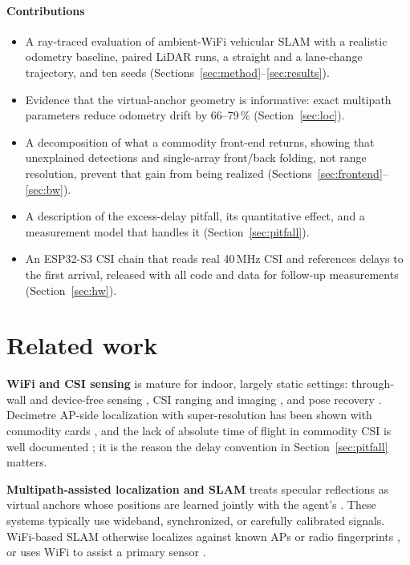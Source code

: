 \documentclass[preprint,12pt]{elsarticle}
\begin{document}
\paragraph{Contributions}
\begin{itemize}
  \item A ray-traced evaluation of ambient-WiFi vehicular SLAM with a realistic odometry
        baseline, paired LiDAR runs, a straight and a lane-change trajectory, and ten seeds
        (Sections~\ref{sec:method}--\ref{sec:results}).
  \item Evidence that the virtual-anchor geometry is informative: exact multipath parameters
        reduce odometry drift by 66--79\,\% (Section~\ref{sec:loc}).
  \item A decomposition of what a commodity front-end returns, showing that unexplained
        detections and single-array front/back folding, not range resolution, prevent that
        gain from being realized (Sections~\ref{sec:frontend}--\ref{sec:bw}).
  \item A description of the excess-delay pitfall, its quantitative effect, and a measurement
        model that handles it (Section~\ref{sec:pitfall}).
  \item An ESP32-S3 CSI chain that reads real 40\,MHz CSI and references delays to the first
        arrival, released with all code and data for follow-up measurements
        (Section~\ref{sec:hw}).
\end{itemize}

\section{Related work}\label{sec:related}

\textbf{WiFi and CSI sensing} is mature for indoor, largely static settings: through-wall and
device-free sensing \cite{chetty2012ttwifi,zhao2018rfpose,zhao2018rfpose3d}, CSI ranging and
imaging \cite{li2021standalone,wang2025csipower,maatta2024csipointcloud}, and pose recovery
\cite{geng2022denseposewifi,yan2024personinwifi3d}. Decimetre AP-side localization with
super-resolution has been shown with commodity cards \cite{kotaru2015spotfi}, and the lack of
absolute time of flight in commodity CSI is well documented \cite{xie2015pdp}; it is the reason
the delay convention in Section~\ref{sec:pitfall} matters.

\textbf{Multipath-assisted localization and SLAM} treats specular reflections as virtual
anchors whose positions are learned jointly with the agent's
\cite{leitinger2015jsac,gentner2016channelslam,ulmschneider2017multipath,leitinger2024mpslamcoop,li2024bpmpslam}.
These systems typically use wideband, synchronized, or carefully calibrated signals. WiFi-based
SLAM otherwise localizes against known APs or radio fingerprints
\cite{arun2022p2slam,liu2023radiofingerprintslam}, or uses WiFi to assist a primary sensor
\cite{arun2022viwid,ismail2022wifilidarslam,li2025ekfwifilidarimu}.
\end{document}
